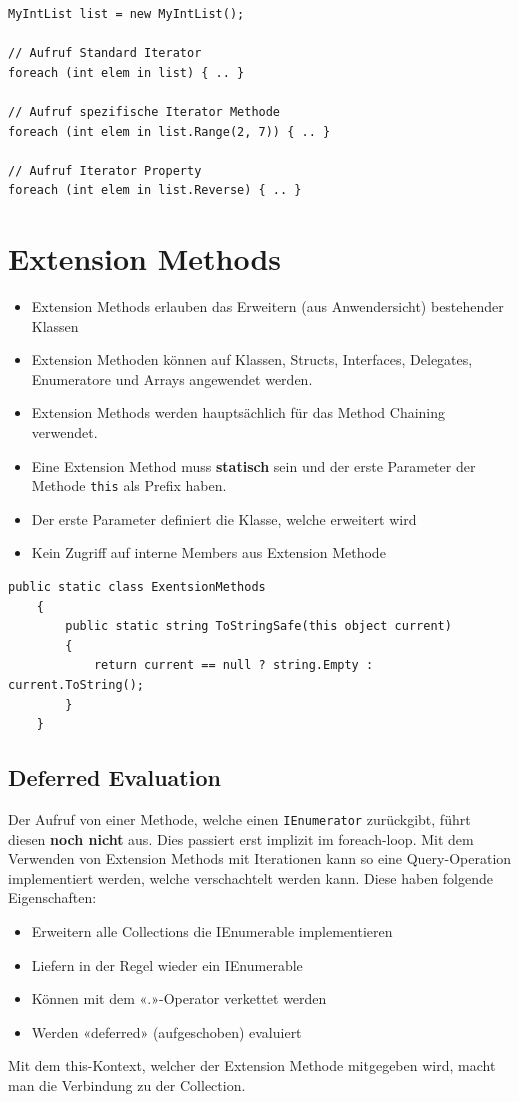 \documentclass[
a4paper,
oneside,
10pt,
fleqn,
headsepline,
toc=listofnumbered, 
bibliography=totocnumbered]{scrartcl}
\let\stdsection\section
\renewcommand\section{\clearpage\stdsection}
\begin{document}
\begin{lstlisting}
MyIntList list = new MyIntList();

// Aufruf Standard Iterator
foreach (int elem in list) { .. }

// Aufruf spezifische Iterator Methode
foreach (int elem in list.Range(2, 7)) { .. }

// Aufruf Iterator Property
foreach (int elem in list.Reverse) { .. }
\end{lstlisting}

\clearpage

\section{Extension Methods}
\begin{itemize}
	\item Extension Methods erlauben das Erweitern (aus Anwendersicht) bestehender Klassen
	\item Extension Methoden können auf Klassen, Structs, Interfaces, Delegates, Enumeratore und Arrays angewendet werden.
	\item Extension Methods werden hauptsächlich für das Method Chaining verwendet.
	\item Eine Extension Method muss \textbf{statisch} sein und der erste Parameter der Methode \lstinline|this| als Prefix haben.
	\item Der erste Parameter definiert die Klasse, welche erweitert wird
	\item Kein Zugriff auf interne Members aus Extension Methode
\end{itemize}

\begin{lstlisting}[language={[Sharp]C}]
 public static class ExentsionMethods
    {
        public static string ToStringSafe(this object current)
        {
            return current == null ? string.Empty : current.ToString();
        }
    }
\end{lstlisting}
\subsection{Deferred Evaluation}
Der Aufruf von einer Methode, welche einen \lstinline|IEnumerator| zurückgibt, führt diesen \textbf{noch nicht} aus.
Dies passiert erst implizit im foreach-loop.
Mit dem Verwenden von Extension Methods mit Iterationen kann so eine Query-Operation implementiert werden, welche verschachtelt werden kann. Diese haben folgende Eigenschaften:
\begin{itemize}
	\item Erweitern alle Collections die IEnumerable implementieren
	\item Liefern in der Regel wieder ein IEnumerable
	\item Können mit dem «.»-Operator verkettet werden
	\item Werden «deferred» (aufgeschoben) evaluiert
\end{itemize}
Mit dem this-Kontext, welcher der Extension Methode mitgegeben wird, macht man die Verbindung zu der Collection.
\end{document}
